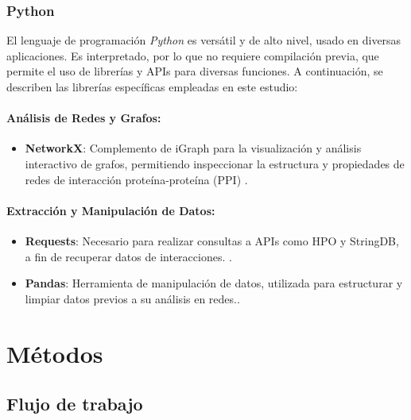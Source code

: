 \subsubsection{Python}
El lenguaje de programación \textit{Python} es versátil y de alto nivel, usado en diversas aplicaciones.  Es interpretado, por lo que no requiere compilación previa, que permite el uso de librerías y APIs para diversas funciones. A continuación, se describen las librerías específicas empleadas en este estudio:

\paragraph{Análisis de Redes y Grafos:}
\begin{itemize}
	\item \textbf{NetworkX}: Complemento de iGraph para la visualización y análisis interactivo de grafos, permitiendo inspeccionar la estructura y propiedades de redes de interacción proteína-proteína (PPI) \cite{hagberg2008}.
\end{itemize}

\paragraph{Extracción y Manipulación de Datos:}
\begin{itemize}
	\item \textbf{Requests}: Necesario para realizar consultas a APIs como HPO y StringDB, a fin de recuperar datos de interacciones. \cite{Requests2020}.
	\item \textbf{Pandas}: Herramienta de manipulación de datos, utilizada para estructurar y limpiar datos previos a su análisis en redes.\cite{McKinney2010}.
\end{itemize}





\section{Métodos}

\subsection{Flujo de trabajo}

